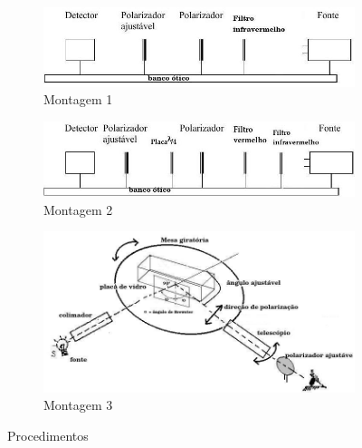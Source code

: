 \documentclass[a4paper,11pt]{article}
\begin{document}
\FloatBarrier
\begin{figure}
	\centering		
	\begin{subfigure}[!htp]{\textwidth}
		\centering
		\includegraphics[scale= 0.5]{./images/montagem1-1.jpg}
		\caption{Montagem 1}
		\label{fig:montage1}
	\end{subfigure}  
	
	\begin{subfigure}[!htp]{\textwidth}
		\centering		
		\includegraphics[scale= 0.5]{./images/montagem1-2.jpg}
		\caption{Montagem 2}
		\label{fig:montagem2}
	\end{subfigure}  

	\begin{subfigure}[!htp]{\textwidth}
		\centering		
		\includegraphics[scale= 0.7]{./images/montagem1-3.jpg}
		\caption{Montagem 3}
		\label{fig:montagem3}
	\end{subfigure}  
	\caption{Procedimentos}
\end{figure}
\FloatBarrier

\end{document}
